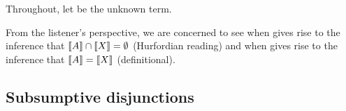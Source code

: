 \documentclass{article}
\begin{document}
\begin{examples}
\item Throughout, let  be the unknown term.

\item From the listener's perspective, we are concerned to see when
   gives rise to the inference that $\llbracket A\rrbracket \cap \llbracket X\rrbracket
  = \emptyset$ (Hurfordian reading) and when  gives rise
  to the inference that $\llbracket A\rrbracket = \llbracket X\rrbracket$ (definitional).
\end{examples}

\newcommand{\smallhurfordlex}[3]{
  \left[
    \begin{array}[c]{l@{ \ \mapsto \ }r l@{ \ \mapsto \ }r l@{ \ \mapsto \ }r}
      A & \set{#1} &
      B & \set{#2} &
      X & \set{#3}
    \end{array}
  \right]}


\subsection{Subsumptive disjunctions}\label{sec:analysis:subsumptive}
\end{document}
